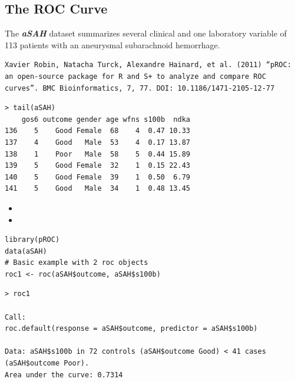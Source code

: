 \documentclass[caret-main.tex]{subfiles}
\begin{document}

\subsection{The ROC Curve}
The \textbf{\textit{aSAH}} dataset summarizes several clinical and one laboratory variable of 113 patients with an aneurysmal subarachnoid hemorrhage.

\begin{verbatim}
Xavier Robin, Natacha Turck, Alexandre Hainard, et al. (2011) “pROC: an open-source package for R and S+ to analyze and compare ROC curves”. BMC Bioinformatics, 7, 77. DOI: 10.1186/1471-2105-12-77
\end{verbatim}

\begin{verbatim}
> tail(aSAH)
    gos6 outcome gender age wfns s100b  ndka
136    5    Good Female  68    4  0.47 10.33
137    4    Good   Male  53    4  0.17 13.87
138    1    Poor   Male  58    5  0.44 15.89
139    5    Good Female  32    1  0.15 22.43
140    5    Good Female  39    1  0.50  6.79
141    5    Good   Male  34    1  0.48 13.45
\end{verbatim}
\begin{itemize}
\item
\item
\end{itemize}
\begin{framed}
\begin{verbatim}
library(pROC)
data(aSAH)
# Basic example with 2 roc objects
roc1 <- roc(aSAH$outcome, aSAH$s100b)
\end{verbatim}
\end{framed}

\begin{verbatim}
> roc1

Call:
roc.default(response = aSAH$outcome, predictor = aSAH$s100b)

Data: aSAH$s100b in 72 controls (aSAH$outcome Good) < 41 cases (aSAH$outcome Poor).
Area under the curve: 0.7314

\end{verbatim}


\end{document}
